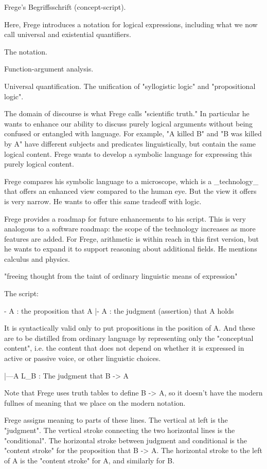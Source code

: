 Frege's Begriffsschrift (concept-script).

Here, Frege introduces a notation for logical expressions, including what we now call universal and existential quantifiers.

The notation.

Function-argument analysis.

Universal quantification. The unification of "syllogistic logic" and "propositional logic". 

The domain of discourse is what Frege calls "scientific truth." In particular he wants to enhance our ability to discuss purely logical arguments without being confused or entangled with language. For example, "A killed B" and "B was killed by A" have different subjects and predicates linguistically, but contain the same logical content. Frege wants to develop a symbolic language for expressing this purely logical content.

Frege compares his symbolic language to a microscope, which is a _technology_ that offers an enhanced view compared to the human eye. But the view it offers is very narrow. He wants to offer this same tradeoff with logic.

Frege provides a roadmap for future enhancements to his script. This is very analogous to a software roadmap: the scope of the technology increases as more features are added. For Frege, arithmetic is within reach in this first version, but he wants to expand it to support reasoning about additional fields. He mentions calculus and physics.

"freeing thought from the taint of ordinary linguistic means of expression"

The script:

- A : the proposition that A
|- A : the judgment (assertion) that A holds

It is syntactically valid only to put propositions in the position of A. And these are to be distilled from ordinary language by representing only the "conceptual content", i.e. the content that does not depend on whether it is expressed in active or passive voice, or other linguistic choices.

|---A
  L_B : The judgment that B -> A

Note that Frege uses truth tables to define B -> A, so it doesn't have the modern fullnes of meaning that we place on the modern notation.

Frege assigns meaning to parts of these lines. The vertical at left is the "judgment". The vertical stroke connecting the two horizontal lines is the "conditional". The horizontal stroke between judgment and conditional is the "content stroke" for the proposition that B -> A. The horizontal stroke to the left of A is the "content stroke" for A, and similarly for B.

